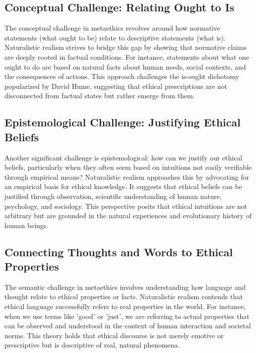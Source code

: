 \documentclass[12pt,a4paper]{article}
\begin{document}
\subsection{Conceptual Challenge: Relating Ought to Is}
The conceptual challenge in metaethics revolves around how normative statements (what ought to be) relate to descriptive statements (what is). Naturalistic realism strives to bridge this gap by showing that normative claims are deeply rooted in factual conditions. For instance, statements about what one ought to do are based on natural facts about human needs, social contexts, and the consequences of actions. This approach challenges the is-ought dichotomy popularized by David Hume, suggesting that ethical prescriptions are not disconnected from factual states but rather emerge from them.

\subsection{Epistemological Challenge: Justifying Ethical Beliefs}
Another significant challenge is epistemological: how can we justify our ethical beliefs, particularly when they often seem based on intuitions not easily verifiable through empirical means? Naturalistic realism approaches this by advocating for an empirical basis for ethical knowledge. It suggests that ethical beliefs can be justified through observation, scientific understanding of human nature, psychology, and sociology. This perspective posits that ethical intuitions are not arbitrary but are grounded in the natural experiences and evolutionary history of human beings.

\subsection{Connecting Thoughts and Words to Ethical Properties}
The semantic challenge in metaethics involves understanding how language and thought relate to ethical properties or facts. Naturalistic realism contends that ethical language successfully refers to real properties in the world. For instance, when we use terms like 'good' or 'just', we are referring to actual properties that can be observed and understood in the context of human interaction and societal norms. This theory holds that ethical discourse is not merely emotive or prescriptive but is descriptive of real, natural phenomena.
\end{document}
